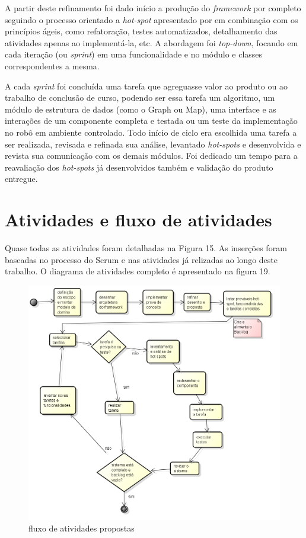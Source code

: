A partir deste refinamento foi dado início a produção do \textit{framework} por completo seguindo o processo orientado a \textit{hot-spot} apresentado por \cite{Fayad1999} em combinação com os princípios ágeis, como refatoração, testes automatizados, detalhamento das atividades apenas ao implementá-la, etc. A abordagem foi \textit{top-down}, focando em cada iteração (ou \textit{sprint}) em uma funcionalidade e no módulo e classes correspondentes a mesma. 

A cada \textit{sprint} foi concluída uma tarefa que agreguasse valor ao produto ou ao trabalho de conclusão de curso, podendo ser essa tarefa um algoritmo, um módulo de estrutura de dados (como o Graph ou Map), uma interface e as interações de um componente completa e testada ou um teste da implementação no robô em ambiente controlado. Todo início de ciclo era escolhida uma tarefa a ser realizada, revisada e refinada sua análise, levantado \textit{hot-spots} e desenvolvida e revista sua comunicação com os demais módulos. Foi dedicado um tempo para a reavaliação dos \textit{hot-spots} já desenvolvidos também e validação do produto entregue.

\section{Atividades e fluxo de atividades}

Quase todas as atividades foram detalhadas na Figura 15. As inserções foram baseadas no processo do Scrum e nas atividades já relizadas ao longo deste trabalho. O diagrama de atividades completo é apresentado na figura 19.

\begin{figure}[h]
	\centering
	\label{fig19}
		\includegraphics[keepaspectratio=true,scale=0.68]{figuras/fluxoatvd.png}
	\caption{fluxo de atividades propostas}
\end{figure}

